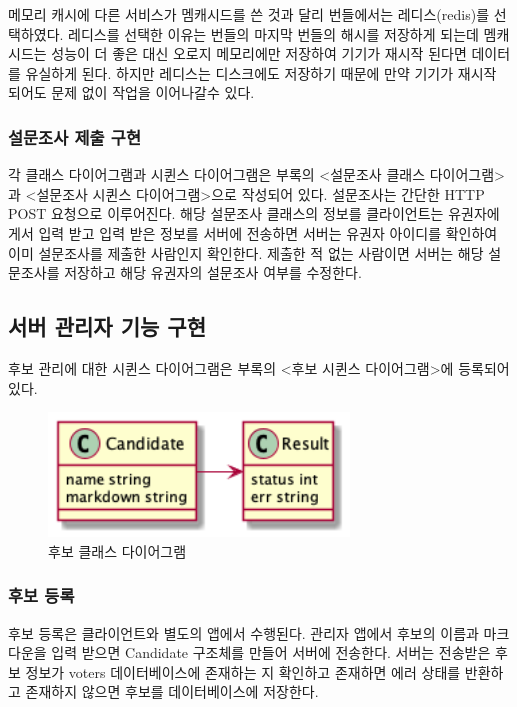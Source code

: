 \documentclass[10pt,a4paper,left=15mm,right=15mm,top=20mm,bottom=20mm]{article}
\begin{document}
    메모리 캐시에 다른 서비스가 멤캐시드를 쓴 것과 달리 번들에서는 레디스(redis)를 선택하였다. 레디스를 선택한 이유는 번들의 마지막 번들의 해시를 저장하게 되는데 멤캐시드는 성능이 더 좋은 대신 오로지 메모리에만 저장하여 기기가 재시작 된다면 데이터를 유실하게 된다. 하지만 레디스는 디스크에도 저장하기 때문에 만약 기기가 재시작 되어도 문제 없이 작업을 이어나갈수 있다.

    \subsubsection{설문조사 제출 구현}

    각 클래스 다이어그램과 시퀸스 다이어그램은 부록의 <설문조사 클래스 다이어그램>과 <설문조사 시퀸스 다이어그램>으로 작성되어 있다.
    설문조사는 간단한 HTTP POST 요청으로 이루어진다. 해당 설문조사 클래스의 정보를 클라이언트는 유권자에게서 입력 받고 입력 받은 정보를 서버에 전송하면 서버는 유권자 아이디를 확인하여 이미 설문조사를 제출한 사람인지 확인한다. 제출한 적 없는 사람이면 서버는 해당 설문조사를 저장하고 해당 유권자의 설문조사 여부를 수정한다.

\subsection{서버 관리자 기능 구현}

    후보 관리에 대한 시퀸스 다이어그램은 부록의 <후보 시퀸스 다이어그램>에 등록되어 있다.

    \begin{figure}[h]
        \begin{center}
            \includegraphics[width=8cm]{candidate}
            \caption{후보 클래스 다이어그램}
        \end{center}
    \end{figure}

    \subsubsection{후보 등록}

    후보 등록은 클라이언트와 별도의 앱에서 수행된다. 관리자 앱에서 후보의 이름과 마크다운을 입력 받으면 Candidate 구조체를 만들어 서버에 전송한다. 서버는 전송받은 후보 정보가 voters 데이터베이스에 존재하는 지 확인하고 존재하면 에러 상태를 반환하고 존재하지 않으면 후보를 데이터베이스에 저장한다.
\end{document}
